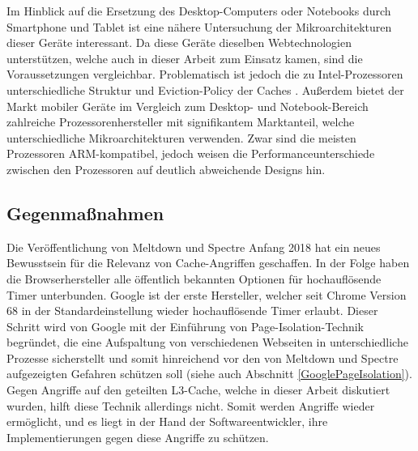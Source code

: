 Im Hinblick auf die Ersetzung des Desktop-Computers oder Notebooks durch Smartphone und Tablet ist eine nähere Untersuchung der Mikroarchitekturen dieser Geräte interessant.
Da diese Geräte dieselben Webtechnologien unterstützen, welche auch in dieser Arbeit zum Einsatz kamen, sind die Voraussetzungen vergleichbar.
Problematisch ist jedoch die zu Intel-Prozessoren unterschiedliche Struktur und Eviction-Policy der Caches \cite{ARMCacheAttacks}.
Außerdem bietet der Markt mobiler Geräte im Vergleich zum Desktop- und Notebook-Bereich zahlreiche Prozessorenhersteller mit signifikantem Marktanteil, welche unterschiedliche Mikroarchitekturen verwenden.
Zwar sind die meisten Prozessoren ARM-kompatibel, jedoch weisen die Performanceunterschiede zwischen den Prozessoren \cite{GeekbenchMobile} auf deutlich abweichende Designs hin. 

\subsection{Gegenmaßnahmen} 

Die Veröffentlichung von Meltdown und Spectre Anfang 2018 hat ein neues Bewusstsein für die Relevanz von Cache-Angriffen geschaffen.
In der Folge haben die Browserhersteller alle öffentlich bekannten Optionen für hochauflösende Timer unterbunden.
Google ist der erste Hersteller, welcher seit Chrome Version 68 in der Standardeinstellung wieder hochauflösende Timer erlaubt.
Dieser Schritt wird von Google mit der Einführung von Page-Isolation-Technik \cite{ChromeSiteIsolation} begründet, die eine Aufspaltung von verschiedenen Webseiten in unterschiedliche Prozesse sicherstellt und somit hinreichend vor den von Meltdown und Spectre aufgezeigten Gefahren schützen soll (siehe auch Abschnitt \ref{GooglePageIsolation}).
Gegen Angriffe auf den geteilten L3-Cache, welche in dieser Arbeit diskutiert wurden, hilft diese Technik allerdings nicht.
Somit werden Angriffe wieder ermöglicht, und es liegt in der Hand der Softwareentwickler, ihre Implementierungen gegen diese Angriffe zu schützen.


